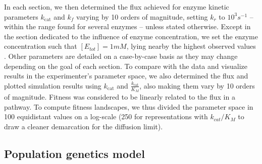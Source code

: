 \documentclass[11pt,onecolumn]{article}
\begin{document}
In each section, we then determined the flux achieved for enzyme kinetic parameters $k_\text{cat}$ and $k_f$ varying by 10 orders of magnitude, setting $k_r$ to $10^3 s^{-1}$ -- within the range found for several enzymes \citep{Klipp94,Knowles77} -- unless stated otherwise. Except in the section dedicated to the influence of enzyme concentration, we set the enzyme concentration such that $[E_{tot}]=1mM$, lying nearby the highest observed values \citep{Albe90,Noor16}. Other parameters are detailed on a case-by-case basis as they may change depending on the goal of each section. To compare with the data and visualize results in the experimenter's parameter space, we also determined the flux and plotted simulation results using $k_\text{cat}$ and $\frac{k_\text{cat}}{K_M}$, also making them vary by 10 orders of magnitude. Fitness was considered to be linearly related to the flux in a pathway. To compute fitness landscapes, we thus divided the parameter space in 100 equidistant values on a log-scale (250 for representations with $k_{cat}/K_M$ to draw a cleaner demarcation for the diffusion limit).

\subsection{Population genetics model}
\end{document}
